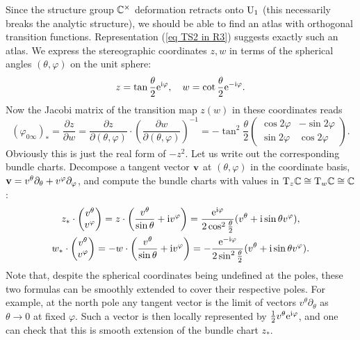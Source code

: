 \begin{example}
    Since the structure group $\bbC^\times$ deformation retracts onto $\U_1$ (this necessarily breaks the analytic structure), we should be able to find an atlas with orthogonal transition functions. Representation (\ref{eq TS2 in R3}) suggests exactly such an atlas. We express the stereographic coordinates $z,w$ in terms of the spherical angles $(\theta,\varphi)$ on the unit sphere:
    \[z=\tan\frac{\theta}{2}\rme^{\rmi\varphi},\quad w=\cot\frac{\theta}{2}\rme^{-\rmi\varphi}.\]
    Now the Jacobi matrix of the transition map $z(w)$ in these coordinates reads
    \[(\varphi_{0\infty})_\ast=\frac{\partial z}{\partial w}=\frac{\partial z}{\partial (\theta,\varphi)}\cdot\left(\frac{\partial w}{\partial (\theta,\varphi)}\right)^{-1}=-\tan^2\frac{\theta}{2}
    \begin{pmatrix}
        \cos2\varphi&-\sin2\varphi\\
        \sin2\varphi& \cos2\varphi
    \end{pmatrix}.
    \]
    Obviously this is just the real form of $-z^2$. Let us write out the corresponding bundle charts. Decompose a tangent vector $\bf{v}$ at $(\theta,\varphi)$ in the coordinate basis, $\bf{v}=v^\theta\partial_\theta+v^\varphi\partial_\varphi$, and compute the bundle charts with values in $\T_z\bbC\cong \T_w\bbC\cong\bbC$:
    \begin{gather}
        z_\ast\cdot\begin{pmatrix}
            v^\theta\\v^\varphi
        \end{pmatrix}=z \cdot \left(\frac{v^\theta}{\sin\theta}+\rmi v^\varphi\right)=\frac{\rme^{\rmi\varphi}}{2\cos^2\frac{\theta}{2}}(v^\theta+\rmi\sin\theta v^\varphi),\\
        w_\ast\cdot\begin{pmatrix}
            v^\theta\\v^\varphi
        \end{pmatrix}=-w\cdot \left(\frac{v^\theta}{\sin\theta}+\rmi v^\varphi\right)=-\frac{\rme^{-\rmi\varphi}}{2\sin^2\frac{\theta}{2}}(v^\theta+\rmi\sin\theta v^\varphi).
    \end{gather}
    Note that, despite the spherical coordinates being undefined at the poles, these two formulas can be smoothly extended to cover their respective poles. For example, at the north pole any tangent vector is the limit of vectors $v^\theta\partial_\theta$ as $\theta\to 0$ at fixed $\varphi$. Such a vector is then locally represented by $\frac12 v^\theta \rme^{\rmi\varphi}$, and one can check that this is smooth extension of the bundle chart $z_\ast$.


\end{example}
